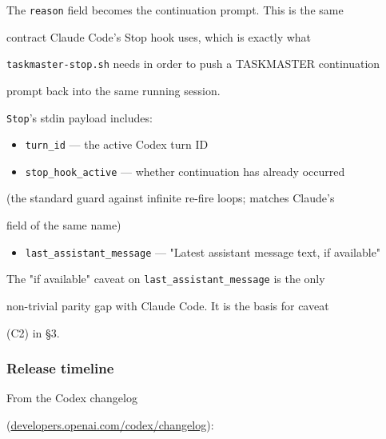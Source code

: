 \documentclass[twocolumn,10pt,letterpaper]{article}
\begin{document}
The \texttt{reason} field becomes the continuation prompt. This is the same

contract Claude Code's Stop hook uses, which is exactly what

\texttt{taskmaster-\allowbreak stop.sh} needs in order to push a TASKMASTER continuation

prompt back into the same running session.


\texttt{Stop}'s stdin payload includes:


\begin{itemize}
\setlength{\itemsep}{0pt}
\setlength{\parskip}{0pt}
  \item \texttt{turn\_id} — the active Codex turn ID
  \item \texttt{stop\_hook\_active} — whether continuation has already occurred
\end{itemize}
  (the standard guard against infinite re-fire loops; matches Claude's

  field of the same name)

\begin{itemize}
\setlength{\itemsep}{0pt}
\setlength{\parskip}{0pt}
  \item \texttt{last\_assistant\_message} — "Latest assistant message text, if available"
\end{itemize}

The "if available" caveat on \texttt{last\_assistant\_message} is the only

non-trivial parity gap with Claude Code. It is the basis for caveat

(C2) in §3.


\subsubsection{Release timeline}

From the Codex changelog

(\href{https://developers.openai.com/codex/changelog}{developers.openai.com/codex/changelog}):
\end{document}
